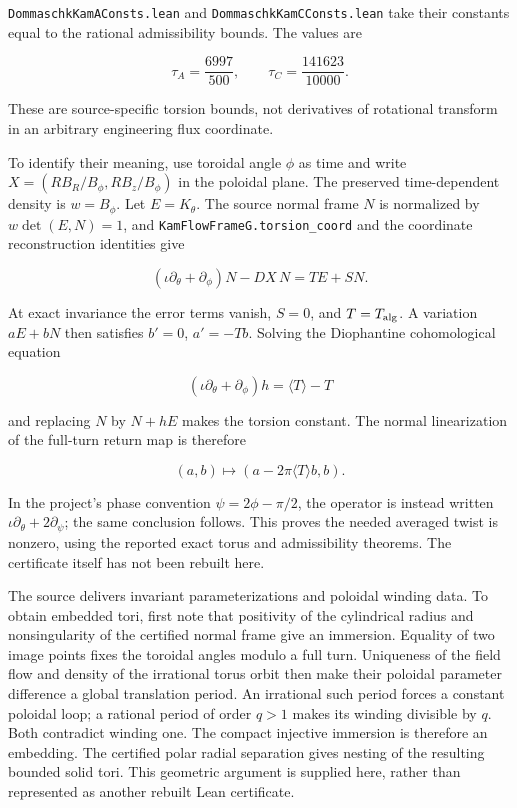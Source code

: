 \texttt{DommaschkKamAConsts.lean} and \texttt{DommaschkKamCConsts.lean} take their constants equal to the rational admissibility bounds. The values are

\[
\tau_A=\frac{6997}{500},\qquad \tau_C=\frac{141623}{10000}.
\]

These are source-specific torsion bounds, not derivatives of rotational transform in an arbitrary engineering flux coordinate.

To identify their meaning, use toroidal angle \(\phi\) as time and write \(X=(RB_R/B_\phi,RB_z/B_\phi)\) in the poloidal plane. The preserved time-dependent density is \(w=B_\phi\). Let \(E=K_\theta\). The source normal frame \(N\) is normalized by \(w\det(E,N)=1\), and \texttt{KamFlowFrameG.torsion\_coord} and the coordinate reconstruction identities give

\[
(\iota\partial_\theta+\partial_\phi)N-DX\,N=T E+S N.
\]

At exact invariance the error terms vanish, \(S=0\), and \(T=T_{\rm alg}\). A variation \(aE+bN\) then satisfies \(b'=0\), \(a'=-Tb\). Solving the Diophantine cohomological equation

\[
(\iota\partial_\theta+\partial_\phi)h=\langle T\rangle-T
\]

and replacing \(N\) by \(N+hE\) makes the torsion constant. The normal linearization of the full-turn return map is therefore

\[
(a,b)\longmapsto(a-2\pi\langle T\rangle b,b).
\]

In the project's phase convention \(\psi=2\phi-\pi/2\), the operator is instead written \(\iota\partial_\theta+2\partial_\psi\); the same conclusion follows. This proves the needed averaged twist is nonzero, using the reported exact torus and admissibility theorems. The certificate itself has not been rebuilt here.

The source delivers invariant parameterizations and poloidal winding data. To obtain embedded tori, first note that positivity of the cylindrical radius and nonsingularity of the certified normal frame give an immersion. Equality of two image points fixes the toroidal angles modulo a full turn. Uniqueness of the field flow and density of the irrational torus orbit then make their poloidal parameter difference a global translation period. An irrational such period forces a constant poloidal loop; a rational period of order \(q>1\) makes its winding divisible by \(q\). Both contradict winding one. The compact injective immersion is therefore an embedding. The certified polar radial separation gives nesting of the resulting bounded solid tori. This geometric argument is supplied here, rather than represented as another rebuilt Lean certificate.

